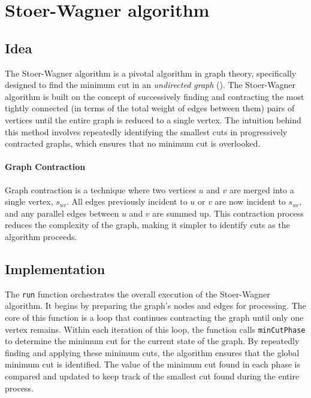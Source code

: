 \section{Stoer-Wagner algorithm}
\label{sec:stoerwagner}

\subsection{Idea}

The Stoer-Wagner algorithm is a pivotal algorithm in graph theory, specifically designed to find the minimum cut in an \emph{undirected graph} (). The Stoer-Wagner algorithm is built on the concept of successively finding and contracting the most tightly connected (in terms of the total weight of edges between them) pairs of vertices until the entire graph is reduced to a single vertex. The intuition behind this method involves repeatedly identifying the smallest cuts in progressively contracted graphs, which ensures that no minimum cut is overlooked.

\paragraph{Graph Contraction}
Graph contraction is a technique where two vertices $u$ and $v$ are merged into a single vertex, \(s_{uv}\). All edges previously incident to $u$ or $v$ are now incident to \(s_{uv}\), and any parallel edges between $u$ and $v$ are summed up. This contraction process reduces the complexity of the graph, making it simpler to identify cuts as the algorithm proceeds.

\subsection{Implementation}

The \texttt{run} function orchestrates the overall execution of the Stoer-Wagner algorithm. It begins by preparing the graph's nodes and edges for processing. The core of this function is a loop that continues contracting the graph until only one vertex remains. Within each iteration of this loop, the function calls \texttt{minCutPhase} to determine the minimum cut for the current state of the graph. By repeatedly finding and applying these minimum cuts, the algorithm ensures that the global minimum cut is identified. The value of the minimum cut found in each phase is compared and updated to keep track of the smallest cut found during the entire process.

